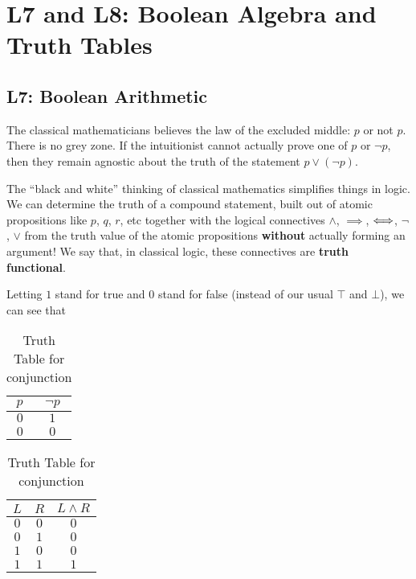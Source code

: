 \chapter{L7 and L8: Boolean Algebra and Truth Tables}

\section{L7: Boolean Arithmetic}
The classical mathematicians believes the law of the excluded middle: $p$ or not $p$.  There is no grey zone.  If the intuitionist cannot actually prove one of $p$ or $\neg p$, then they remain agnostic about the truth of the statement $p \vee (\neg p)$.

The ``black and white'' thinking of classical mathematics simplifies things in logic.  We can determine the truth of a compound statement, built out of atomic propositions like $p$, $q$, $r$, etc together with the  logical connectives $\wedge$, $\implies$, $\Longleftrightarrow$, $\neg$, $\vee$ from the truth value of the atomic propositions \textbf{without} actually forming an argument!  We say that, in classical logic, these connectives are \textbf{truth functional}.

Letting $1$ stand for true and $0$ stand for false (instead of our usual $\top$ and $\bot$), we can see that 

\begin{table}[h!]
	\begin{center}
		\caption{Truth Table for conjunction}
		\begin{tabular}{c|c} 
			$p$  & $\neg p$ \\
			\hline
			$0$ & $1$ \\ 
			$0$ & $0$ \\ 
		\end{tabular}
	\end{center}
\end{table}

\begin{table}[h!]
	\begin{center}
		\caption{Truth Table for conjunction}
		\begin{tabular}{c|c|c} 
			$L$ & $R$ & $L \wedge R$ \\
			\hline
			$0$ & $0$ & $0$ \\ 
			$0$ & $1$ & $0$ \\ 
			$1$ & $0$ & $0$ \\ 
			$1$ & $1$ & $1$ \\ 
		\end{tabular}
	\end{center}
\end{table}

